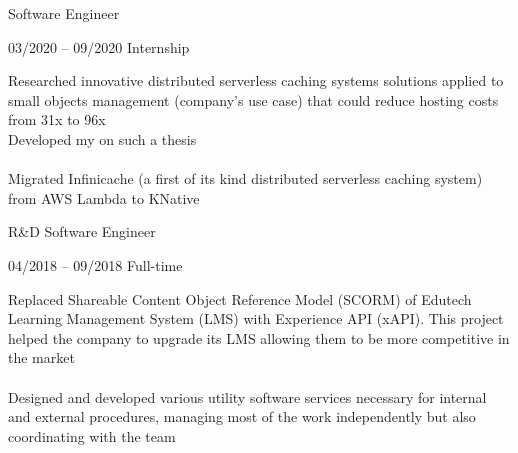 \documentclass[9pt, green]{template/developercv} %
\begin{document}
{\begin{entrylist}
{		
	}
	{Software Engineer}
	
	\entry
	{03/2020 -- 09/2020}
	{}
	{Internship}
	{
		\vspace{0.3mm}
		\begin{minipage}[t]{0.75\textwidth}
			\vspace{-\baselineskip}
			\itemmarker Researched innovative distributed serverless caching systems solutions applied to small objects management (company's use case) that could reduce hosting costs from 31x to 96x\\
			\itemmarker Developed my  on such a thesis\\
			\vspace{-3mm}\\
			\itemmarker Migrated Infinicache (a first of its kind distributed serverless caching system) from AWS Lambda to KNative\\
			\vspace{-3mm}
		\end{minipage}

	}
	{R\&D Software Engineer}
	
	\entry
		{04/2018 -- 09/2018}
		{}
		{Full-time}
		{
			\vspace{0.3mm}
			\begin{minipage}[t]{0.75\textwidth}
				\vspace{-\baselineskip}
				\itemmarker Replaced Shareable Content Object Reference Model (SCORM) of Edutech Learning Management System (LMS) with Experience API (xAPI). This project helped the company to upgrade its LMS allowing them to be more competitive in the market\\
				\vspace{-3mm}\\
				\itemmarker Designed and developed various utility software services necessary for internal and external procedures, managing most of the work independently but also coordinating with the team\\
				\vspace{-3mm}
			\end{minipage}

}
\end{entrylist}}
\end{document}
